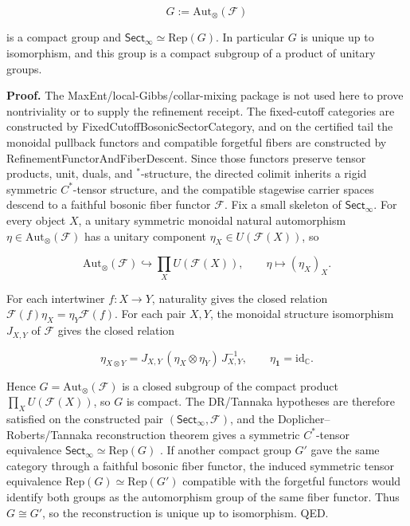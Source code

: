 \[
G := \mathrm{Aut}_\otimes(\mathcal F)
\]

is a compact group and \(\mathsf{Sect}_\infty \simeq \mathrm{Rep}(G)\). In particular \(G\) is unique up to isomorphism, and this group is a compact subgroup of a product of unitary groups.

\textbf{Proof.} The MaxEnt/local-Gibbs/collar-mixing package is not used here to prove nontriviality or to supply the refinement receipt. The fixed-cutoff categories are constructed by FixedCutoffBosonicSectorCategory, and on the certified tail the monoidal pullback functors and compatible forgetful fibers are constructed by RefinementFunctorAndFiberDescent. Since those functors preserve tensor products, unit, duals, and \(^*\)-structure, the directed colimit inherits a rigid symmetric \(C^*\)-tensor structure, and the compatible stagewise carrier spaces descend to a faithful bosonic fiber functor \(\mathcal F\). Fix a small skeleton of \(\mathsf{Sect}_\infty\). For every object \(X\), a unitary symmetric monoidal natural automorphism \(\eta \in \mathrm{Aut}_\otimes(\mathcal F)\) has a unitary component \(\eta_X \in U(\mathcal F(X))\), so

\[
\mathrm{Aut}_\otimes(\mathcal F) \hookrightarrow \prod_X U(\mathcal F(X)), \qquad \eta \mapsto (\eta_X)_X.
\]

For each intertwiner \(f:X\to Y\), naturality gives the closed relation \(\mathcal F(f)\eta_X=\eta_Y\mathcal F(f)\). For each pair \(X,Y\), the monoidal structure isomorphism \(J_{X,Y}\) of \(\mathcal F\) gives the closed relation

\[
\eta_{X\otimes Y}=J_{X,Y}\,(\eta_X\otimes\eta_Y)\,J_{X,Y}^{-1},
\qquad
\eta_{\mathbf 1}=\mathrm{id}_{\mathbb C}.
\]

Hence \(G=\mathrm{Aut}_\otimes(\mathcal F)\) is a closed subgroup of the compact product \(\prod_X U(\mathcal F(X))\), so \(G\) is compact. The DR/Tannaka hypotheses are therefore satisfied on the constructed pair \((\mathsf{Sect}_\infty,\mathcal F)\), and the Doplicher--Roberts/Tannaka reconstruction theorem gives a symmetric \(C^*\)-tensor equivalence \(\mathsf{Sect}_\infty \simeq \mathrm{Rep}(G)\) \cite{dr89,dr90}. If another compact group \(G'\) gave the same category through a faithful bosonic fiber functor, the induced symmetric tensor equivalence \(\mathrm{Rep}(G)\simeq\mathrm{Rep}(G')\) compatible with the forgetful functors would identify both groups as the automorphism group of the same fiber functor. Thus \(G\cong G'\), so the reconstruction is unique up to isomorphism. QED.

